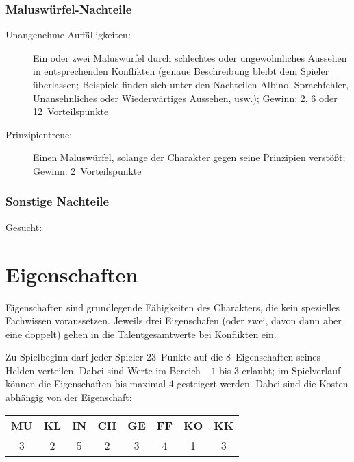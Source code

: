 \subsubsection{Maluswürfel-Nachteile}
\begin{description}
  \item[Unangenehme Auffälligkeiten:] Ein oder zwei Maluswürfel durch schlechtes oder ungewöhnliches Aussehen in entsprechenden Konflikten (genaue Beschreibung bleibt dem Spieler überlassen; Beispiele finden sich unter den Nachteilen Albino, Sprachfehler, Unansehnliches oder Wiederwärtiges Aussehen, usw.); Gewinn: 2, 6 oder 12~Vorteilspunkte
  \item[Prinzipientreue:] Einen Maluswürfel, solange der Charakter gegen seine Prinzipien verstößt; Gewinn: 2~Vorteilspunkte
  \item[]
\end{description}

\subsubsection{Sonstige Nachteile}
\begin{description}
  \item[Gesucht:] 
  \item[]
  \item[]
\end{description}



\section{Eigenschaften}
Eigenschaften sind grundlegende Fähigkeiten des Charakters, die kein spezielles Fachwissen voraussetzen. Jeweils drei Eigenschafen (oder zwei, davon dann aber eine doppelt) gehen in die Talentgesamtwerte bei Konflikten ein.

Zu Spielbeginn darf jeder Spieler 23~Punkte auf die 8~Eigenschaften seines Helden verteilen. Dabei sind Werte im Bereich $-1$ bis $3$ erlaubt; im Spielverlauf können die Eigenschaften bis maximal $4$ gesteigert werden. Dabei sind die Kosten abhängig von der Eigenschaft:

\begin{tabular}[C]{cccccccc}
  \bf MU\index{Mut}%
& \bf KL\index{Klugheit}%
& \bf IN\index{Intuition}%
& \bf CH\index{Charisma}%
& \bf GE\index{Gewandtheit}%
& \bf FF\index{Fingerfertigkeit}%
& \bf KO\index{Konstitution}%
& \bf KK\index{Körperkraft}%
\\
3 & 2 & 5 & 2 & 3 & 4 & 1 & 3 \\
\end{tabular}

